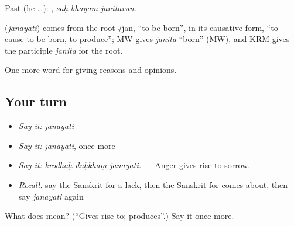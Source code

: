 Past (he …):   , \emph{saḥ bhayaṃ janitavān}.

\begin{cousinweb}
\textbf{} (\emph{janayati}) comes from the root √jan, \textquotedblleft{}to be born\textquotedblright{}, in its causative form, \textquotedblleft{}to cause to be born, to produce\textquotedblright{}; MW gives \emph{janita} \textquotedblleft{}born\textquotedblright{} (MW), and KRM gives the participle \emph{janita} for the root.
\end{cousinweb}

\begin{grammarlens}[title={What you've built}]
One more word for giving reasons and opinions.
\end{grammarlens}

\subsection*{Your turn}
\begin{itemize}
\raggedright
  \item \emph{Say it:} \emph{janayati}
  \item \emph{Say it:} \emph{janayati}, once more
  \item \emph{Say it:} \emph{krodhaḥ duḥkhaṃ janayati.} — Anger gives rise to sorrow.
  \item \emph{Recall:} say the Sanskrit for a lack, then the Sanskrit for comes about, then say \emph{janayati} again
\end{itemize}

\begin{tcolorbox}[breakable,colback=teal!4,colframe=teal!35!black,title={Before you move on}]
What does  mean? (\textquotedblleft{}Gives rise to; produces\textquotedblright{}.) Say it once more.
\end{tcolorbox}
